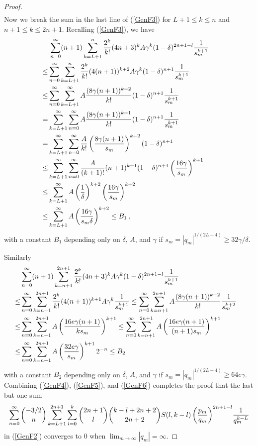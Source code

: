 \documentclass{article}
\theoremstyle{remark}
\numberwithin{equation}{section}
\begin{document}
\begin{proof}
\begin{equation}
\begin{split}
\end{split} \end{equation}
Now we break the sum in the last line of (\ref{GenF3}) for $L+1 \leq k \leq n$ and $n+1 \leq k \leq 2n+1$. Recalling (\ref{GenF3}),
we have  
\begin{equation} \label{GenF5} \begin{split}
& \, \sum_{n=0}^\infty (n+1) \sum_{k=L+1}^{n} \frac{2^k}{k!} (4n+3)^k A\gamma^k (1-\delta)^{2n+1-l} \frac{1}{s_m^{k+1}} \cr 
\leq & \sum_{n=0}^\infty \sum_{k=L+1}^{n} \frac{2^k}{k!} (4(n+1))^{k+2} A\gamma^k (1-\delta)^{n+1} \frac{1}{s_m^{k+1}} \cr
\leq & \sum_{n=0}^\infty \sum_{k=L+1}^{\infty} A \frac{(8\gamma(n+1))^{k+2}}{k!} (1-\delta)^{n+1} \frac{1}{s_m^{k+1}} \cr  
= & \sum_{k=L+1}^\infty \sum_{n=0}^{\infty} A \frac{(8\gamma(n+1))^{k+1}}{k!} (1-\delta)^{n+1} \frac{1}{s_m^{k+1}} \cr
= & \sum_{k=L+1}^\infty \sum_{n=0}^{\infty} \frac{A}{k!} \left( \frac{8\gamma(n+1)}{s_m} \right)^{k+2} (1-\delta)^{n+1} \cr
\leq & \sum_{k=L+1}^\infty \sum_{n=0}^{\infty} \frac{A}{(k+1)!} (n+1)^{k+1} (1-\delta)^{n+1} \left( \frac{16\gamma}{s_m} \right)^{k+1} \cr
\leq & \sum_{k=L+1}^\infty A \left( \frac{1}{\delta} \right)^{k+2} \left( \frac{16\gamma}{s_m} \right)^{k+2} \cr
\leq & \sum_{k=L+1}^\infty A \left( \frac{16\gamma}{s_m\delta} \right)^{k+2} \leq B_1\,,\cr
\end{split} \end{equation}
with a constant $B_1$ depending only on $\delta$, $A$, and $\gamma$ if $s_m = \left|q_m\right|^{1/(2L+4)} \geq 32\gamma/\delta$. 
 
Similarly
\begin{equation}\label{GenF6} \begin{split}
& \sum_{n=0}^\infty (n+1) \sum_{k=n+1}^{2n+1} \frac{2^k}{k!} (4n+3)^k A\gamma^k (1-\delta)^{2n+1-l} \frac{1}{s_m^{k+1}} \cr 
\leq & \sum_{n=0}^\infty \sum_{k=n+1}^{2n+1} \frac{2^k}{k!} (4(n+1))^{k+1} A\gamma^k \frac{1}{s_m^{k+1}} 
\leq \sum_{n=0}^\infty \sum_{k=n+1}^{2n+1} A \frac{(8\gamma(n+1))^{k+2}}{k!} \frac{1}{s_m^{k+2}} \cr  
\leq & \sum_{n=0}^\infty \sum_{k=n+1}^{2n+1} A \left( \frac{16e\gamma(n+1)}{ks_m} \right)^{k+1} 
\leq \sum_{n=0}^\infty \sum_{k=n+1}^{2n+1} A \left( \frac{16e\gamma(n+1)}{{(n+1)s_m}} \right)^{k+1} \cr 
\leq & \sum_{n=0}^\infty \sum_{k=n+1}^{2n+1} A \left( \frac{32e\gamma}{s_m} \right)^{k+1}2^{-n} \leq B_2 \cr
\end{split} \end{equation}
with a constant $B_2$ depending only on $\delta$, $A$, and $\gamma$ if $s_m = \left|q_m\right|^{1/(2L+4)} \geq 64e\gamma$.
Combining (\ref{GenF4}), (\ref{GenF5}), and (\ref{GenF6}) completes the proof that the last but one sum  
\begin{equation} \notag 
\sum_{n=0}^\infty{\binom{-3/2}{n} \sum_{k=L+1}^{2n+1}\sum_{l=0}^k \binom{2n+1}{l} \binom{k-l+2n+2}{2n+2} 
S(l,k-l) \left( \frac{p_m}{q_m} \right)^{2n+1-l}} \frac{1}{q_m^{k-L}} 
\end{equation}
in (\ref{GenF2}) converges to $0$ when $\displaystyle{\lim_{m \rightarrow \infty}{|q_m|}} = \infty$.


\end{proof}
\end{document}
